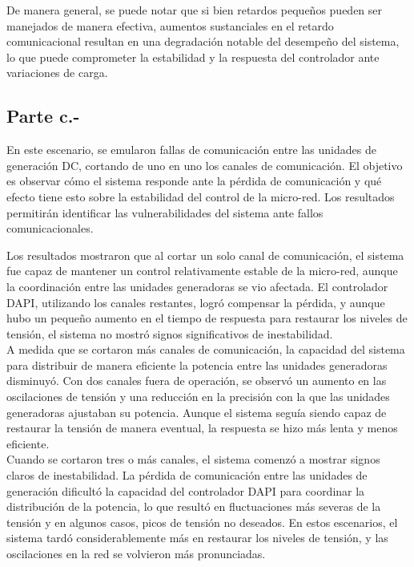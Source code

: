 De manera general, se puede notar que si bien retardos pequeños pueden ser manejados de manera efectiva, aumentos sustanciales en el retardo comunicacional resultan en una degradación notable del desempeño del sistema, lo que puede comprometer la estabilidad y la respuesta del controlador ante variaciones de carga.

\subsection{Parte c.-}

En este escenario, se emularon fallas de comunicación entre las unidades de generación DC, cortando de uno en uno los canales de comunicación. El objetivo es observar cómo el sistema responde ante la pérdida de comunicación y qué efecto tiene esto sobre la estabilidad del control de la micro-red. Los resultados permitirán identificar las vulnerabilidades del sistema ante fallos comunicacionales.


Los resultados mostraron que al cortar un solo canal de comunicación, el sistema fue capaz de mantener un control relativamente estable de la micro-red, aunque la coordinación entre las unidades generadoras se vio afectada. El controlador DAPI, utilizando los canales restantes, logró compensar la pérdida, y aunque hubo un pequeño aumento en el tiempo de respuesta para restaurar los niveles de tensión, el sistema no mostró signos significativos de inestabilidad.\\

A medida que se cortaron más canales de comunicación, la capacidad del sistema para distribuir de manera eficiente la potencia entre las unidades generadoras disminuyó. Con dos canales fuera de operación, se observó un aumento en las oscilaciones de tensión y una reducción en la precisión con la que las unidades generadoras ajustaban su potencia. Aunque el sistema seguía siendo capaz de restaurar la tensión de manera eventual, la respuesta se hizo más lenta y menos eficiente.\\

Cuando se cortaron tres o más canales, el sistema comenzó a mostrar signos claros de inestabilidad. La pérdida de comunicación entre las unidades de generación dificultó la capacidad del controlador DAPI para coordinar la distribución de la potencia, lo que resultó en fluctuaciones más severas de la tensión y en algunos casos, picos de tensión no deseados. En estos escenarios, el sistema tardó considerablemente más en restaurar los niveles de tensión, y las oscilaciones en la red se volvieron más pronunciadas.\\

